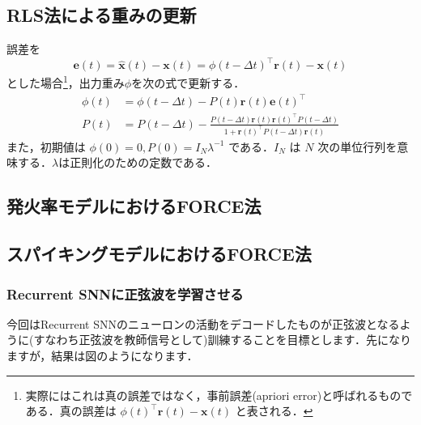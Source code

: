 \subsection{RLS法による重みの更新}
誤差を 
\begin{equation}
\boldsymbol{e}(t)=\hat{\boldsymbol{x}}(t)-\boldsymbol{x}(t)=\phi(t-\Delta t)^\top \boldsymbol{r}(t)-\boldsymbol{x}(t)    
\end{equation}
とした場合\footnote{実際にはこれは真の誤差ではなく，事前誤差(apriori error)と呼ばれるものである．真の誤差は $\phi(t)^\top \boldsymbol{r}(t)-\boldsymbol{x}(t)$ と表される．}，出力重み$\phi$を次の式で更新する．
\begin{align}
\phi(t)&=\phi(t-\Delta t)-P(t) \boldsymbol{r}(t)\boldsymbol{e}(t)^\top\\
P(t)&=P(t-\Delta t)-\frac{P(t-\Delta t) \boldsymbol{r}(t) \boldsymbol{r}(t)^\top P(t-\Delta t)}{1+\boldsymbol{r}(t)^\top P(t-\Delta
t) \boldsymbol{r}(t)} 
\end{align}
また，初期値は $\phi(0)=0, P(0)=I_{N}\lambda^{-1}$ である．$I_{N}$ は $N$ 次の単位行列を意味する．$\lambda$は正則化のための定数である．
\subsection{発火率モデルにおけるFORCE法}
\subsection{スパイキングモデルにおけるFORCE法}
\subsubsection{Recurrent SNNに正弦波を学習させる}
今回はRecurrent SNNのニューロンの活動をデコードしたものが正弦波となるように(すなわち正弦波を教師信号として)訓練することを目標とします．先になりますが，結果は図のようになります．
